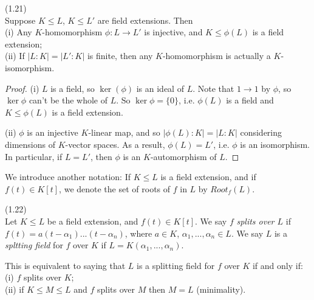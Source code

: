 \documentclass[a4paper]{article}
\begin{document}
\begin{lemma} (1.21)\\
Suppose $K \leq L$, $K \leq L'$ are field extensions. Then \\
(i) Any $K$-homomorphism $\phi:L \to L'$ is injective, and $K \leq \phi(L)$ is a field extension;\\
(ii) If $|L:K| = |L':K|$ is finite, then any $K$-homomorphism is actually a $K$-isomorphism.
\begin{proof}
(i) $L$ is a field, so $\ker(\phi)$ is an ideal of $L$. Note that $1 \to 1$ by $\phi$, so $\ker \phi$ can't be the whole of $L$. So $\ker\phi = \{0\}$, i.e. $\phi(L)$ is a field and $K \leq \phi(L)$ is a field extension.

(ii) $\phi$ is an injective $K$-linear map, and so $|\phi(L):K| = |L:K|$ considering dimensions of $K$-vector spaces. As a result, $\phi(L) = L'$, i.e. $\phi$ is an isomorphism.\\
In particular, if $L=L'$, then $\phi$ is an $K$-automorphism of $L$.
\end{proof}
\end{lemma}

We introduce another notation: If $K \leq L$ is a field extension, and if $f(t) \in K[t]$, we denote the set of roots of $f$ in $L$ by $Root_f (L)$.

\begin{defi} (1.22)\\
Let $K \leq L$ be a field extension, and $f(t) \in K[t]$. We say $f$ \emph{splits over $L$} if $f(t) = a(t-\alpha_1)...(t-\alpha_n)$, where $a \in K$, $\alpha_1,...,\alpha_n \in L$. We say $L$ is a \emph{spltting field} for $f$ over $K$ if $L = K(\alpha_1,...,\alpha_n)$.
\end{defi}

\begin{rem}
This is equivalent to saying that $L$ is a splitting field for $f$ over $K$ if and only if:\\
(i) $f$ splits over $K$;\\
(ii) if $K \leq M \leq L$ and $f$ splits over $M$ then $M = L$ (minimality).
\end{rem}
\end{document}
